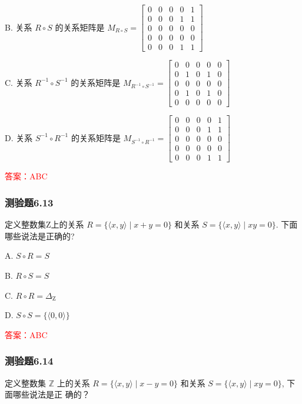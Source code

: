 \documentclass[UTF8, heading=true]{ctexart}
\begin{document}
B. 关系 $R \circ S$ 的关系矩阵是 $M_{R \circ S}=\left[\begin{array}{lllll}0 & 0 & 0 & 0 & 1 \\ 0 & 0 & 0 & 1 & 1 \\ 0 & 0 & 0 & 0 & 0 \\ 0 & 0 & 0 & 0 & 0 \\ 0 & 0 & 0 & 1 & 1\end{array}\right]$

C. 关系 $R^{-1} \circ S^{-1}$ 的关系矩阵是 $M_{R^{-1} \circ S^{-1}}=\left[\begin{array}{lllll}0 & 0 & 0 & 0 & 0 \\ 0 & 1 & 0 & 1 & 0 \\ 0 & 0 & 0 & 0 & 0 \\ 0 & 1 & 0 & 1 & 0 \\ 0 & 0 & 0 & 0 & 0\end{array}\right]$

D. 关系 $S^{-1} \circ R^{-1}$ 的关系矩阵是 $M_{S^{-1} \circ R^{-1}}=\left[\begin{array}{ccccc}0 & 0 & 0 & 0 & 1 \\ 0 & 0 & 0 & 1 & 1 \\ 0 & 0 & 0 & 0 & 0 \\ 0 & 0 & 0 & 0 & 0 \\ 0 & 0 & 0 & 1 & 1\end{array}\right]$

\textcolor{red}{答案：ABC}




\subsubsection{测验题6.13}
定义整数集Z上的关系 $R=\{\langle x, y\rangle \mid x+y=0\}$ 和关系 $S=\{\langle x, y\rangle \mid x y=0\}$. 下面哪些说法是正确的?

A. 
$
S \circ R=S
$

B. 
$
R \circ S=S
$

C. 
$
R \circ R=\Delta_{\mathrm{Z}}
$

D. 
$
S \circ S=\{\langle 0,0\rangle\}
$

\textcolor{red}{答案：ABC}

\subsubsection{测验题6.14}

定义整数集 $\mathbb{Z}$ 上的关系 $R=\{\langle x, y\rangle \mid x-y=0\}$ 和关系 $S=\{\langle x, y\rangle \mid x y=0\}$, 下面哪些说法是正
确的？
\end{document}
